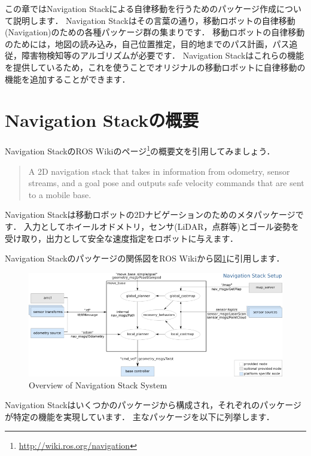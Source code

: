 \documentclass[{../../master}]{subfiles}
\begin{document}
この章ではNavigation Stackによる自律移動を行うためのパッケージ作成について説明します．
Navigation Stackはその言葉の通り，移動ロボットの自律移動(Navigation)のための各種パッケージ群の集まりです．
移動ロボットの自律移動のためには，地図の読み込み，自己位置推定，目的地までのパス計画，パス追従，障害物検知等のアルゴリズムが必要です．
Navigation Stackはこれらの機能を提供しているため，これを使うことでオリジナルの移動ロボットに自律移動の機能を追加することができます．


\section{Navigation Stackの概要}

Navigation StackのROS Wikiのページ\footnote{\url{http://wiki.ros.org/navigation}}の概要文を引用してみましょう．

\begin{quote}
  A 2D navigation stack that takes in information from odometry, sensor streams, and a goal pose and outputs safe velocity commands that are sent to a mobile base.
\end{quote}

Navigation Stackは移動ロボットの2Dナビゲーションのためのメタパッケージです．
入力としてホイールオドメトリ，センサ(LiDAR，点群等)とゴール姿勢を受け取り，出力として安全な速度指定をロボットに与えます．

Navigation Stackのパッケージの関係図をROS Wikiから図\ref{fig:navigation_stack_overview}に引用します．

\begin{figure}[ht]
  \centering
  \includegraphics[width=120truemm]{images/navigation_stack_overview.png}
  \caption{Overview of Navigation Stack System}
  \label{fig:navigation_stack_overview}
\end{figure}

Navigation Stackはいくつかのパッケージから構成され，それぞれのパッケージが特定の機能を実現しています．
主なパッケージを以下に列挙します．
\end{document}
